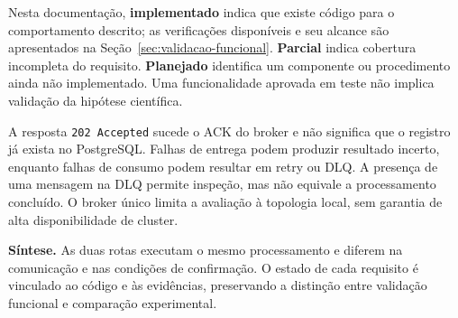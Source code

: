 Nesta documentação, \textbf{implementado} indica que existe código para o comportamento descrito; as verificações disponíveis e seu alcance são apresentados na Seção~\ref{sec:validacao-funcional}. \textbf{Parcial} indica cobertura incompleta do requisito. \textbf{Planejado} identifica um componente ou procedimento ainda não implementado. Uma funcionalidade aprovada em teste não implica validação da hipótese científica.

A resposta \texttt{202 Accepted} sucede o ACK do broker e não significa que o registro já exista no PostgreSQL. Falhas de entrega podem produzir resultado incerto, enquanto falhas de consumo podem resultar em retry ou DLQ. A presença de uma mensagem na DLQ permite inspeção, mas não equivale a processamento concluído. O broker único limita a avaliação à topologia local, sem garantia de alta disponibilidade de cluster.

\textbf{Síntese.} As duas rotas executam o mesmo processamento e diferem na comunicação e nas condições de confirmação. O estado de cada requisito é vinculado ao código e às evidências, preservando a distinção entre validação funcional e comparação experimental.
